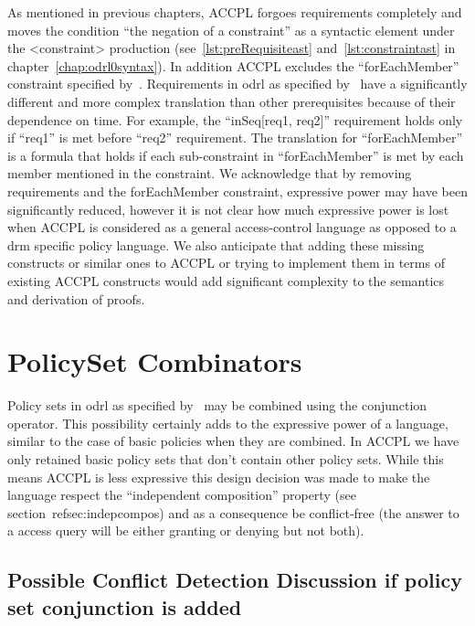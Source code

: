 As mentioned in previous chapters, \ac{ACCPL} forgoes requirements completely and moves the condition ``the negation of a constraint'' as a syntactic element under the <constraint> production (see~\ref{lst:preRequisiteast} and~\ref{lst:constraintast} in chapter~\ref{chap:odrl0syntax}). In addition \ac{ACCPL} excludes the ``forEachMember'' constraint specified by~\cite{pucella2006}. Requirements in \ac{odrl} as specified by~\cite{pucella2006} have a significantly different and more complex translation than other prerequisites because of their dependence on time. For example, the ``inSeq[req1, req2]'' requirement holds only if ``req1'' is met before ``req2'' requirement. The translation for ``forEachMember'' is a formula that holds if each sub-constraint in ``forEachMember'' is met by each member mentioned in the constraint. We acknowledge that by removing requirements and the forEachMember constraint, expressive power may have been significantly reduced, however it is not clear how much expressive power is lost when \ac{ACCPL} is considered as a general access-control language as opposed to a \ac{drm} specific policy language. We also anticipate that adding these missing constructs or similar ones to \ac{ACCPL} or trying to implement them in terms of existing \ac{ACCPL} constructs would add significant complexity to the semantics and derivation of proofs.

\section{PolicySet Combinators}  

Policy sets in \ac{odrl} as specified by~\cite{pucella2006} may be combined using the conjunction operator. This possibility certainly adds to the expressive power of a language, similar to the case of basic policies when they are combined. In \ac{ACCPL} we have only retained basic policy sets that don't contain other policy sets. While this means \ac{ACCPL} is less expressive this design decision was made to make the language respect the ``independent composition'' property (see section~ref{sec:indepcompos}) and as a consequence be conflict-free (the answer to a access query will be either granting or denying but not both). 

\subsection{Possible Conflict Detection Discussion if policy set conjunction is added}  
